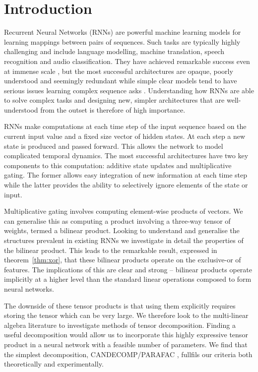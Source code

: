 \chapter{Introduction}\label{C:intro}
Recurrent Neural Networks (RNNs) are powerful machine learning models for learning mappings between
pairs of sequences. Such tasks are typically highly challenging and include language modelling,
machine translation, speech recognition and audio classification. They have achieved remarkable
success even at immense scale \autocite{Wu2016a}, but the most successful architectures are
opaque, poorly understood and seemingly redundant while simple clear models tend to have serious
issues learning complex sequence asks \autocite{Bengio1994}. Understanding how RNNs are able to
solve complex tasks and designing new, simpler architectures that are well-understood from the
outset is therefore of high importance.

RNNs make computations at each time step of the input sequence based on the current input value and
a fixed size vector of hidden states. At each step a new state is produced and passed forward. This
allows the network to model complicated temporal dynamics. 
The most successful architectures have two key components to this computation:
additive state updates and multiplicative gating. The former allows easy integration of new information
at each time step while the latter provides the ability to selectively ignore elements of the
state or input. 

Multiplicative gating involves computing element-wise products of vectors. We can
generalise this as computing a product involving a three-way tensor of weights, termed
a bilinear product. Looking to understand and generalise the structures prevalent in
existing RNNs we investigate in detail the properties of the bilinear product. 
This leads to the remarkable
result, expressed in theorem~\ref{thm:xor}, that these bilinear products operate on the exclusive-or
of features. The implications of this are clear and strong -- bilinear products operate
implicitly at a higher level than the standard linear operations composed to form neural networks.

The downside of these tensor products is that using them explicitly requires storing the tensor which
can be very large. We therefore look to the multi-linear algebra literature to investigate methods of
tensor decomposition. Finding a useful decomposition would allow us to incorporate this highly expressive
tensor product in a neural network with a feasible number of parameters. We find that the simplest
decomposition, CANDECOMP/PARAFAC \autocite{Carroll1970, Harshman1970}, fullfils our criteria
both theoretically and experimentally.


